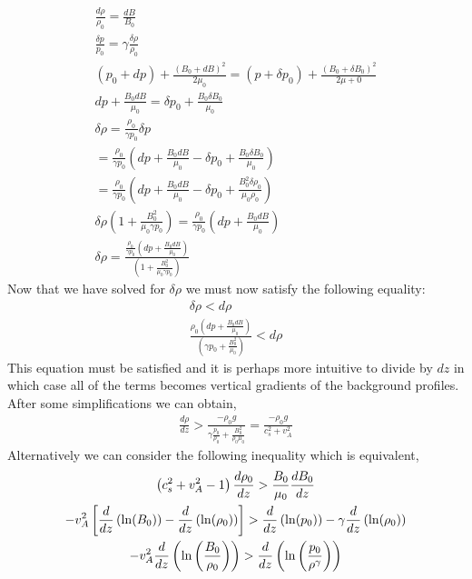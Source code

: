 \documentclass{article}
\begin{document}
\begin{gather*}
    \frac{d\rho}{\rho_0} = \frac{dB}{B_0}\\
    \frac{\delta p}{p_0} = \gamma \frac{\delta \rho}{\rho_0}\\
    (p_0+dp) + \frac{(B_0 + d B)^2}{2\mu_0} = (p+\delta p_0) + \frac{(B_0 + \delta
    B_0)^2}{2\mu+0}\\
    dp + \frac{B_0dB}{\mu_0} = \delta p_0 + \frac{B_0\delta B_0}{\mu_0}\\
    \delta\rho = \frac{\rho_0}{\gamma p_0}\delta p\\
    = \frac{\rho_0}{\gamma p_0}\left(dp + \frac{B_0dB}{\mu_0} - \delta p_0 +
    \frac{B_0\delta B_0}{\mu_0}\right)\\
    = \frac{\rho_0}{\gamma p_0}\left(dp + \frac{B_0dB}{\mu_0} - \delta p_0 +
    \frac{B_0^2\delta \rho_0}{\mu_0\rho_0}\right)\\
    \delta\rho\left(1 + \frac{B_0^2}{\mu_0\gamma p_0}\right) =
    \frac{\rho_0}{\gamma p_0}\left(dp + \frac{B_0dB}{\mu_0}\right)\\
    \delta\rho = \frac{\frac{\rho_0}{\gamma p_0}\left(dp +
    \frac{B_0dB}{\mu_0}\right)}{\left(1 + \frac{B_0^2}{\mu_0\gamma
    p_0}\right)}
\end{gather*}
Now that we have solved for $\delta\rho$ we must now satisfy the following
equality:
\begin{gather*}
    \delta \rho < d\rho\\
    \frac{\rho_0\left(dp +
    \frac{B_0dB}{\mu_0}\right)}{\left(\gamma p_0 + \frac{B_0^2}{\mu_0}\right)} < d\rho
\end{gather*}
This equation must be satisfied and it is perhaps more intuitive to divide by
$dz$ in which case all of the terms becomes vertical gradients of the background
profiles. After some simplifications we can obtain, 
\begin{gather*}
    \frac{d\rho}{dz} > \frac{-\rho_0 g}{\gamma \frac{p_0}{\rho_0} +
    \frac{B_0^2}{\rho_0\mu_0}} = \frac{-\rho_0 g}{c_s^2+v_A^2}
\end{gather*}
Alternatively we can consider the following inequality which is equivalent,
\begin{gather*}
    \left(c_s^2 + v_A^2 - 1\right) \frac{d\rho_0}{dz} >
    \frac{B_0}{\mu_0}\frac{d B_0}{d z}\\
    -v_A^2\left[\frac{d }{d z}\left(\ln(B_0)\right) -
    \frac{d }{d z}\left(\ln(\rho_0)\right)\right] > \frac{d }{d z}\left(\ln(p_0)\right) -
    \gamma\frac{d }{d z}\left(\ln(\rho_0)\right)\\
    -v_A^2\frac{d }{d z}\left(\ln\left(\frac{B_0}{\rho_0}\right)\right)>
    \frac{d }{d z}\left(\ln\left(\frac{p_0}{\rho^{\gamma}}\right)\right)
\end{gather*}


\begin{gather*}
\end{gather*}
\end{document}
